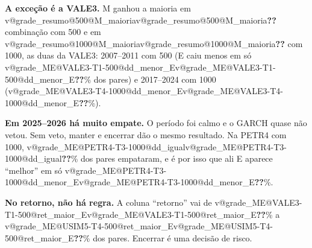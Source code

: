\documentclass[11pt,a4paper]{article}
\makeatletter
\newcommand{\V}[3]{\ifcsname v@#1@#2@#3\endcsname\csname v@#1@#2@#3\endcsname\else\textbf{\color{red}??}\fi}
\makeatother
\begin{document}
\textbf{A exceção é a VALE3.} M ganhou a maioria em \V{grade_resumo}{500}{M_maioria} combinação com 500 e em
\V{grade_resumo}{1000}{M_maioria} com 1000, as duas da VALE3: 2007--2011 com 500 (E caiu menos em só \V{grade_ME}{VALE3-T1-500}{dd_menor_E}\%
dos pares) e 2017--2024 com 1000 (\V{grade_ME}{VALE3-T4-1000}{dd_menor_E}\%).

\textbf{Em 2025--2026 há muito empate.} O período foi calmo e o GARCH quase não vetou. Sem veto, manter e
encerrar dão o mesmo resultado. Na PETR4 com 1000, \V{grade_ME}{PETR4-T3-1000}{dd_igual}\% dos pares empataram,
e é por isso que ali E aparece ``melhor'' em só \V{grade_ME}{PETR4-T3-1000}{dd_menor_E}\%.

\textbf{No retorno, não há regra.} A coluna ``retorno'' vai de \V{grade_ME}{VALE3-T1-500}{ret_maior_E}\% a
\V{grade_ME}{USIM5-T4-500}{ret_maior_E}\% dos pares. Encerrar é uma decisão de risco.
\end{document}
